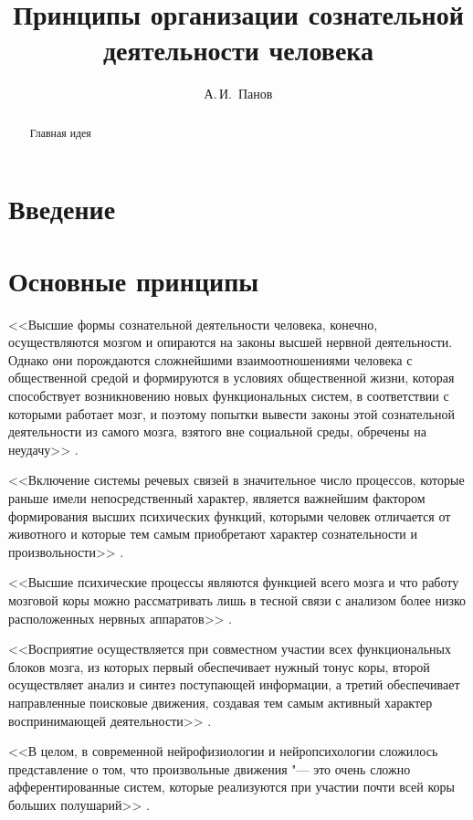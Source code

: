 \documentclass[a4paper,12pt]{article}
\begin{document}
	\title{Принципы организации сознательной деятельности человека}
	\author{А.\,И.~Панов}
	
	\maketitle{}
	
	\begin{abstract}
		Главная идея
	\end{abstract}
	
	\section*{Введение}

	\section{Основные принципы}
	
	<<Высшие формы сознательной деятельности человека, конечно, осуществляются мозгом и опираются на законы высшей нервной деятельности. Однако они порождаются сложнейшими взаимоотношениями человека с общественной средой и формируются в условиях общественной жизни, которая способствует возникновению новых функциональных систем, в соответствии с которыми работает мозг, и поэтому попытки вывести законы этой сознательной деятельности из самого мозга, взятого вне социальной среды, обречены на неудачу>> \cite{Luria1977}.
	
	<<Включение системы речевых связей в значительное число процессов, которые раньше имели непосредственный характер, является важнейшим фактором формирования высших психических функций, которыми человек отличается от животного и которые тем самым приобретают характер сознательности и произвольности>> \cite{Luria2000}.
	
	<<Высшие психические процессы являются функцией всего мозга и что работу мозговой коры можно рассматривать лишь в тесной связи с анализом более низко расположенных нервных аппаратов>> \cite{Luria2000}.
	
	<<Восприятие осуществляется при совместном участии всех функциональных блоков мозга, из которых первый обеспечивает нужный тонус коры, второй осуществляет анализ и синтез поступающей информации, а третий обеспечивает направленные поисковые движения, создавая тем самым активный характер воспринимающей деятельности>> \cite{Luria2003}.
	
	<<В целом, в современной нейрофизиологии и нейропсихологии сложилось представление о том, что произвольные движения "--- это очень сложно афферентированные систем, которые реализуются при участии почти всей коры больших полушарий>> \cite{Homskaya2015}.
	
\end{document}
